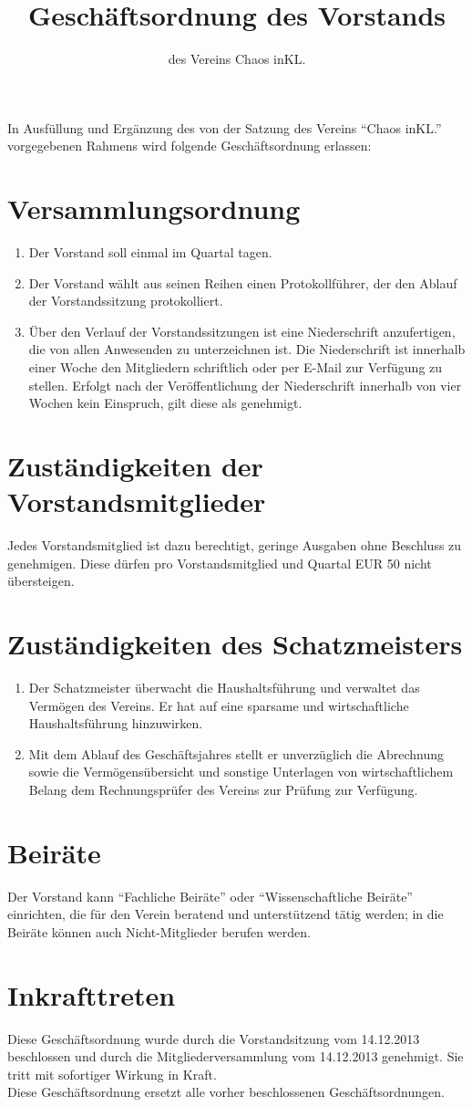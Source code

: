 \documentclass[a4paper, 12pt]{scrartcl}
\title{Geschäftsordnung des Vorstands}
\subtitle{des Vereins Chaos inKL.}
\author{}
\date{}
\begin{document}
\maketitle
In Ausfüllung und Ergänzung des von der Satzung des Vereins "`Chaos
inKL."' vorgegebenen Rahmens wird folgende Geschäftsordnung erlassen:

\section{Versammlungsordnung}
\begin{enumerate}
	\item Der Vorstand soll einmal im Quartal tagen.
\item Der Vorstand wählt aus seinen Reihen einen Protokollführer, der den
Ablauf der Vorstandssitzung protokolliert.
	\item Über den Verlauf der Vorstandssitzungen ist eine Niederschrift
anzufertigen, die von allen Anwesenden zu unterzeichnen ist. Die
Niederschrift ist innerhalb einer Woche den Mitgliedern schriftlich oder
per E-Mail zur Verfügung zu stellen. Erfolgt nach der Veröffentlichung der
Niederschrift innerhalb von vier Wochen kein Einspruch, gilt diese als
genehmigt.
\end{enumerate}

\section{Zuständigkeiten der Vorstandsmitglieder}
Jedes Vorstandsmitglied ist dazu berechtigt, geringe Ausgaben ohne Beschluss zu genehmigen. Diese dürfen pro Vorstandsmitglied und Quartal EUR 50 nicht übersteigen.

\section{Zuständigkeiten des Schatzmeisters}
\begin{enumerate}
	\item Der Schatzmeister überwacht die Haushaltsführung und verwaltet das
Vermögen des Vereins. Er hat auf eine sparsame und wirtschaftliche
Haushaltsführung hinzuwirken.
	\item Mit dem Ablauf des Geschäftsjahres stellt er unverzüglich die Abrechnung
sowie die Vermögensübersicht und sonstige Unterlagen von
wirtschaftlichem Belang dem Rechnungsprüfer des Vereins zur Prüfung zur
Verfügung.
\end{enumerate}

\section{Beiräte}
Der Vorstand kann "`Fachliche Beiräte"' oder "`Wissenschaftliche Beiräte"' einrichten,
die für den Verein beratend und unterstützend tätig werden; in die Beiräte können
auch Nicht-Mitglieder berufen werden.

\section{Inkrafttreten}
Diese Geschäftsordnung wurde durch die Vorstandsitzung vom 14.12.2013
beschlossen und durch die Mitgliederversammlung
vom 14.12.2013 genehmigt. Sie tritt mit sofortiger Wirkung in Kraft.\\
Diese Geschäftsordnung ersetzt alle vorher beschlossenen Geschäftsordnungen.
\end{document}
